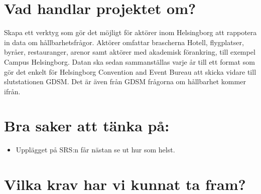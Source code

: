 \documentclass{article}
\date {#1}
\title {
    \documentTitle {Helsingborg Event and Convention Bureau}
    
    \documentDate {}
}
\begin{document}
\maketitle
\thispagestyle{empty}

\newpage




\newpage

\section{Vad handlar projektet om?}
    Skapa ett verktyg som gör det möjligt för aktörer inom Helsingborg att rappotera in data om hållbarhetsfrågor. Aktörer omfattar brascherna Hotell, flygplatser, byråer, restauranger, arenor samt aktörer med akademisk förankring, till exempel Campus Helsingborg. Datan ska sedan sammanställas varje år till ett format som gör det enkelt för Helsingborg Convention and Event Bureau att skicka vidare till slutstationen GDSM. Det är även från GDSM frågorna om hållbarhet kommer ifrån.
    \\
    
    \section{Bra saker att tänka på: }
    \begin{itemize}
        \item Upplägget på SRS:n får nästan se ut hur som helst.
    \end{itemize}
    
\section{Vilka krav har vi kunnat ta fram?}
\end{document}
